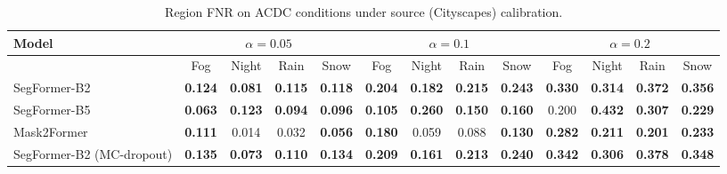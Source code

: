 \begin{table}[t]
\centering
\caption{Region FNR on ACDC conditions under source (Cityscapes) calibration.}
\label{tab:breakdown}
\footnotesize
\setlength{\tabcolsep}{3pt}
\begin{tabular}{lcccccccccccc}
\toprule
Model & \multicolumn{4}{c}{$\alpha=0.05$} & \multicolumn{4}{c}{$\alpha=0.1$} & \multicolumn{4}{c}{$\alpha=0.2$} \\
\midrule
 & Fog & Night & Rain & Snow & Fog & Night & Rain & Snow & Fog & Night & Rain & Snow \\
\midrule
SegFormer-B2 & \textbf{0.124} & \textbf{0.081} & \textbf{0.115} & \textbf{0.118} & \textbf{0.204} & \textbf{0.182} & \textbf{0.215} & \textbf{0.243} & \textbf{0.330} & \textbf{0.314} & \textbf{0.372} & \textbf{0.356} \\
SegFormer-B5 & \textbf{0.063} & \textbf{0.123} & \textbf{0.094} & \textbf{0.096} & \textbf{0.105} & \textbf{0.260} & \textbf{0.150} & \textbf{0.160} & 0.200 & \textbf{0.432} & \textbf{0.307} & \textbf{0.229} \\
Mask2Former & \textbf{0.111} & 0.014 & 0.032 & \textbf{0.056} & \textbf{0.180} & 0.059 & 0.088 & \textbf{0.130} & \textbf{0.282} & \textbf{0.211} & \textbf{0.201} & \textbf{0.233} \\
SegFormer-B2 (MC-dropout) & \textbf{0.135} & \textbf{0.073} & \textbf{0.110} & \textbf{0.134} & \textbf{0.209} & \textbf{0.161} & \textbf{0.213} & \textbf{0.240} & \textbf{0.342} & \textbf{0.306} & \textbf{0.378} & \textbf{0.348} \\
\bottomrule
\end{tabular}
\end{table}

